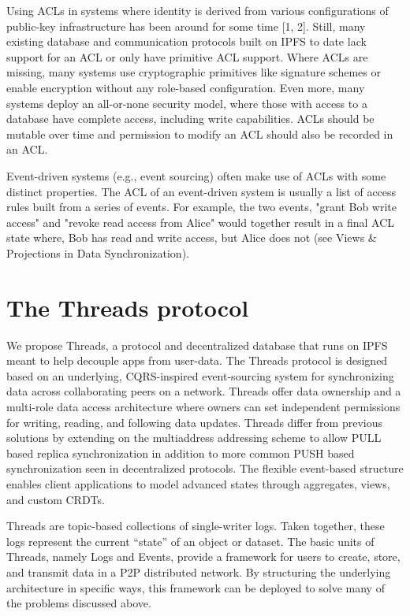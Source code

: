 \documentclass{comjnl}
\begin{document}
Using ACLs in systems where identity is derived from various configurations of public-key infrastructure has been around for some time [1, 2]. Still, many existing database and communication protocols built on IPFS to date lack support for an ACL or only have primitive ACL support. Where ACLs are missing, many systems use cryptographic primitives like signature schemes or enable encryption without any role-based configuration. Even more, many systems deploy an all-or-none security model, where those with access to a database have complete access, including write capabilities. ACLs should be mutable over time and permission to modify an ACL should also be recorded in an ACL.

Event-driven systems (e.g., event sourcing) often make use of ACLs with some distinct properties. The ACL of an event-driven system is usually a list of access rules built from a series of events. For example, the two events, "grant Bob write access" and "revoke read access from Alice" would together result in a final ACL state where, Bob has read and write access, but Alice does not (see Views \& Projections in Data Synchronization).


\section{The Threads protocol}

We propose Threads, a protocol and decentralized database that runs on IPFS meant to help decouple apps from user-data. The Threads protocol is designed based on an underlying, CQRS-inspired event-sourcing system for synchronizing data across collaborating peers on a network. Threads offer data ownership and a multi-role data access architecture where owners can set independent permissions for writing, reading, and following data updates. Threads differ from previous solutions by extending on the multiaddress addressing scheme to allow PULL based replica synchronization in addition to more common PUSH based synchronization seen in decentralized protocols. The flexible event-based structure enables client applications to model advanced states through aggregates, views, and custom CRDTs.

Threads are topic-based collections of single-writer logs. Taken together, these logs represent the current “state” of an object or dataset. The basic units of Threads, namely Logs and Events, provide a framework for users to create, store, and transmit data in a P2P distributed network. By structuring the underlying architecture in specific ways, this framework can be deployed to solve many of the problems discussed above.
\end{document}
